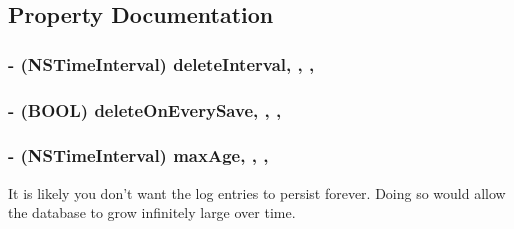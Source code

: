 \subsection{Property Documentation}
\hypertarget{interface_d_d_abstract_database_logger_a6ae601d281eea50ffcb0f27c50ec3700}{
\subsubsection[{delete\-Interval}]{\setlength{\rightskip}{0pt plus 5cm}-\/ (N\-S\-Time\-Interval) delete\-Interval\hspace{0.3cm}{\ttfamily [read]}, {\ttfamily [write]}, {\ttfamily [atomic]}, {\ttfamily [assign]}}}\label{interface_d_d_abstract_database_logger_a6ae601d281eea50ffcb0f27c50ec3700}
\hypertarget{interface_d_d_abstract_database_logger_abc644d3087912778b30bc9e68945a5bf}{
\subsubsection[{delete\-On\-Every\-Save}]{\setlength{\rightskip}{0pt plus 5cm}-\/ (B\-O\-O\-L) delete\-On\-Every\-Save\hspace{0.3cm}{\ttfamily [read]}, {\ttfamily [write]}, {\ttfamily [atomic]}, {\ttfamily [assign]}}}\label{interface_d_d_abstract_database_logger_abc644d3087912778b30bc9e68945a5bf}
\hypertarget{interface_d_d_abstract_database_logger_a48793e11870e3dce07bbb4ca9ea3a302}{
\subsubsection[{max\-Age}]{\setlength{\rightskip}{0pt plus 5cm}-\/ (N\-S\-Time\-Interval) max\-Age\hspace{0.3cm}{\ttfamily [read]}, {\ttfamily [write]}, {\ttfamily [atomic]}, {\ttfamily [assign]}}}\label{interface_d_d_abstract_database_logger_a48793e11870e3dce07bbb4ca9ea3a302}
It is likely you don't want the log entries to persist forever. Doing so would allow the database to grow infinitely large over time.

